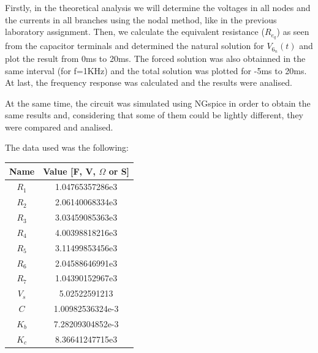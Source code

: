 Firstly, in the theoretical analysis we will determine the voltages in all nodes and the currents in all branches using the nodal method, like in the previous laboratory assignment. Then, we calculate the equivalent resistance ($R_{e_q}$) as seen from the capacitor terminals and determined the natural solution for $V_{6_n}(t)$ and plot the result from 0ms to 20ms. The forced solution was also obtainned in the same interval (for f=1KHz) and the total solution was plotted for -5ms to 20ms. At last, the frequency response was calculated and the results were analised. \par
At the same time, the circuit was simulated using NGspice in order to obtain the same results and, considering that some of them could be lightly different, they were compared and analised.\par
The data used was the following:
\begin{center}
  \begin{tabular}{ | c | c | }
    \hline    
    {\bf Name} & {\bf Value [F, V, $\Omega$ or S]} \\ \hline
    $R_1$ & 1.04765357286e3 \\ \hline 
    $R_2$ & 2.06140068334e3 \\ \hline 
    $R_3$ & 3.03459085363e3 \\ \hline 
    $R_4$ & 4.00398818216e3 \\ \hline 
    $R_5$ & 3.11499853456e3 \\ \hline 
    $R_6$ & 2.04588646991e3 \\ \hline 
    $R_7$ & 1.04390152967e3 \\ \hline 
    $V_s$ & 5.02522591213 \\ \hline 
    $C$ & 1.00982536324e-3 \\ \hline
    $K_b$ & 7.28209304852e-3 \\ \hline
    $K_c$ & 8.36641247715e3 \\ 
    \hline
  \end{tabular}
\end{center}



